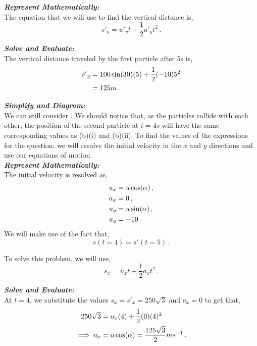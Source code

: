 \begin{subquestions}
\begin{subsubquestions}
\subsubquestion

\textbf{\textit{Represent Mathematically:}} \\			
The equation that we will use to find the vertical distance is,
\begin{equation}
	{s'}_y ={u'}_yt + \frac{1}{2}{a'}_yt^2 \,.	
\end{equation}




\textbf{\textit{Solve and Evaluate:}} \\
The vertical distance traveled by the first particle after 5s is,
\begin{align}
	{s'}_y & = 100\sin(30)(5) + \frac{1}{2}(-10)5^2 \nonumber \\
		& = 125m \,.
\end{align}


\subsubquestion

\textbf{\textit{Simplify and Diagram:}} \\
We can still consider . We should notice that, as the particles collide with each other, the position of the second particle at $t=4s$ will have the same corresponding values as (b)(i) and (b)(ii). To find the values of the expressions for the question, we will resolve the initial velocity in the $x$ and $y$ directions and use our equations of motion.\\




\textbf{\textit{Represent Mathematically:}} \\
The initial velocity is resolved as,
\begin{align}
	u_x & = u\cos(\alpha) \,, \nonumber \\
	a_x & = 0 \,, \nonumber \\
	u_y & = u\sin(\alpha) \,, \nonumber \\
	a_y & = -10 \,.
\end{align}
We will make use of the fact that,
\begin{equation}
	s(t=4) = {s'}(t=5) \,.
\end{equation}

To solve this problem, we will use,
\begin{equation}
	s_x = u_xt + \frac{1}{2}a_xt^2 \,.
\end{equation}




\textbf{\textit{Solve and Evaluate:}} \\
At $t=4$, we substitute the values $s_x={s'}_x=250\sqrt{3}$ and $a_x=0$ to get that,
\begin{align}
	250\sqrt{3} & = u_x(4) + \frac{1}{2}(0)(4)^2 \nonumber \\
	\implies u_x & = u\cos(\alpha) = \frac{125\sqrt{3}}{2}ms^{-1} \,.
\end{align} 


\end{subsubquestions}
\end{subquestions}
